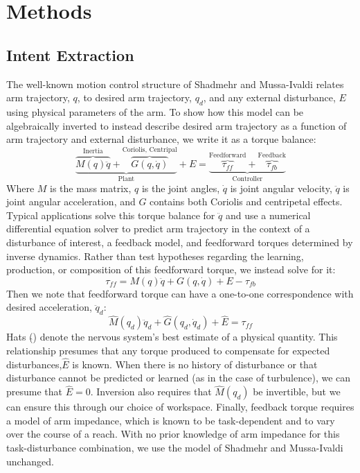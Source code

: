 \documentclass[letterpaper, 10 pt, conference]{ieeeconf}  %
\begin{document}
\section{Methods}

\subsection{Intent Extraction}
The well-known motion control structure of Shadmehr and Mussa-Ivaldi\cite{shadmehr1994adaptive} relates arm trajectory, $q$, to desired arm trajectory, $q_d$, and any external disturbance, $E$ using physical parameters of the arm. To show how this model can be algebraically inverted to instead describe desired arm trajectory as a function of arm trajectory and external disturbance, we write it as a torque balance:
\begin{equation}
\underbrace{\overbrace{M(q)\ddot{q}}^{\text{Inertia}}+\overbrace{G(q,\dot{q})}^{\text{Coriolis, Centripal}}}_{\text{Plant}}+E=
\underbrace{\overbrace{\tau_{ff}}^{\text{Feedforward}}+\overbrace{\tau_{fb}}^{\text{Feedback}}}_\text{Controller}
\end{equation}
Where $M$ is the mass matrix, $q$ is the joint angles, $\dot{q}$ is joint angular velocity, $\ddot{q}$ is joint angular acceleration, and $G$ contains both Coriolis and centripetal effects. Typical applications solve this torque balance for $\ddot{q}$ and use a numerical differential equation solver to predict arm trajectory in the context of a disturbance of interest, a feedback model, and feedforward torques determined by inverse dynamics. Rather than test hypotheses regarding the learning, production, or composition of this feedforward torque, we instead solve for it:
\begin{equation}
\tau_{ff}=M(q)\ddot{q}+G(q,\dot{q})+E-\tau_{fb}
\end{equation}
Then we note that feedforward torque can have a one-to-one correspondence with desired acceleration, $\ddot{q}_d$:
\begin{equation}
\hat{M}(q_d)\ddot{q}_d+\hat{G}(q_d,\dot{q}_d)+\hat{E}=\tau_{ff}
\end{equation}
Hats ($\hat{}$) denote the nervous system's best estimate of a physical quantity. This relationship presumes that any torque produced to compensate for expected disturbances,$\hat{E}$ is known. When there is no history of disturbance or that disturbance cannot be predicted or learned (as in the case of turbulence), we can presume that $\hat{E}=0$. Inversion also requires that $\hat{M}(q_d)$ be invertible, but we can ensure this through our choice of workspace. Finally, feedback torque requires a model of arm impedance, which is known to be task-dependent and to vary over the course of a reach. With no prior knowledge of arm impedance for this task-disturbance combination, we use the model of Shadmehr and Mussa-Ivaldi unchanged.
\end{document}
